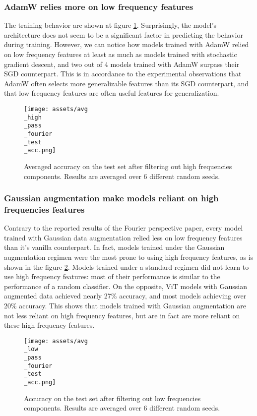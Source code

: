 \documentclass{article} \author{Simon Théorêt}
\begin{document}
\subsubsection*{AdamW relies more on low frequency features}
The training behavior are shown at figure
\ref{fig:higherror}. Surprisingly, the model's architecture does not
seem to be a significant factor in predicting the behavior during
training.  However, we can notice how models trained with AdamW relied
on low frequency features at least as much as models trained with
stochastic gradient descent, and two out of 4 models trained with
AdamW surpass their SGD counterpart. This is in accordance to the
experimental observations that AdamW often selects more generalizable
features than its SGD counterpart, and that low frequency features are
often useful features for generalization.

\begin{figure}[h]
  \centering
  \texttt{[image: assets/avg\\\_high\\\_pass\\\_fourier\\\_test\\\_acc.png]}
  \caption{Averaged accuracy on the test set after filtering out high
    frequencies components. Results are averaged over 6 different
    random seeds.}
	\label{fig:higherror}
\end{figure}

\subsubsection*{Gaussian augmentation make models reliant on high
  frequencies features }
Contrary to the reported results of the Fourier perspective paper,
every model trained with Gaussian data augmentation relied less on low
frequency features than it's vanilla counterpart. In fact, models
trained under the Gaussian augmentation regimen were the most prone to
using high frequency features, as is shown in the figure
\ref{fig:lowerror}. Models trained under a standard regimen
did not learn to use high frequency features: most of their
performance is similar to the performance of a random classifier. On
the opposite, ViT models with Gaussian augmented data achieved nearly
27\% accuracy, and most models achieving over 20\% accuracy. This
shows that models trained with Gaussian augmentation are not less
reliant on high frequency features, but are in fact are more reliant on
these high frequency features.

\begin{figure}[h!]
  \centering
  \texttt{[image: assets/avg\\\_low\\\_pass\\\_fourier\\\_test\\\_acc.png]}
  \caption{Accuracy on the test set after filtering out low
    frequencies components. Results are averaged over 6 different
    random seeds.}
	\label{fig:lowerror}
\end{figure}
\end{document}

